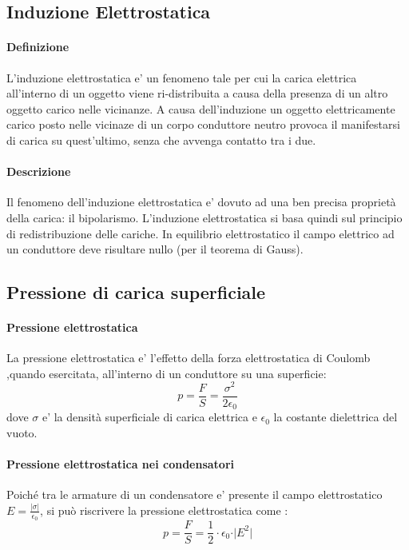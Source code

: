 \documentclass[a4paper, 10pt]{article}
\begin{document}
		\subsection{Induzione Elettrostatica}
			\paragraph*{Definizione} L'induzione elettrostatica e' un fenomeno tale per cui la carica elettrica all'interno di un
			 oggetto viene ri-distribuita a causa della presenza di un altro oggetto carico nelle vicinanze. 
			 A causa dell'induzione un oggetto elettricamente carico posto nelle vicinaze di un 
			 corpo conduttore neutro provoca il manifestarsi di carica su quest'ultimo, senza che avvenga contatto tra i due.
			 \paragraph*{Descrizione} Il fenomeno dell'induzione elettrostatica e' dovuto ad una ben precisa proprietà della 
			 carica: il bipolarismo. L'induzione elettrostatica si basa quindi sul principio di redistribuzione delle cariche. 
			 In equilibrio elettrostatico il campo elettrico ad un conduttore deve risultare nullo (per il teorema di Gauss). 
		\subsection{Pressione di carica superficiale}
			\paragraph*{Pressione elettrostatica} La pressione elettrostatica e' l'effetto della forza elettrostatica di Coulomb
			,quando esercitata, all'interno di un conduttore su una superficie:
			\[ p = \frac{F}{S} = \frac{\sigma^2}{2\epsilon_0} \]
			dove $\sigma$ e' la densità superficiale di carica elettrica e $\epsilon_0$ la costante dielettrica del vuoto.
			\paragraph*{Pressione elettrostatica nei condensatori}
			Poiché tra le armature di un condensatore e' presente il campo elettrostatico 
			$E = \frac{\vert \sigma \vert}{\epsilon_0}$, si può riscrivere la pressione elettrostatica come :
			\[ p = \frac{F}{S}	 = \frac{1}{2} \cdot \epsilon_0 \cdot \vert E^2 \vert \]
\end{document}
